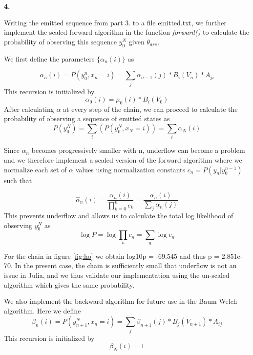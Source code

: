 \documentclass{article}
\begin{document}
\textbf{\large{4.}}

Writing the emitted sequence from part 3. to a file emitted.txt, we further implement the scaled forward algorithm in the function \textit{forward()} to calculate the probability of observing this sequence $y_0^N$ given $\theta_{ass}$.

We first define the parameters $\{\alpha_n(i)\}$ as

\begin{equation}
\alpha_n(i) = P(y_0^n, x_n=i) = \sum_j{\alpha_{n-1}(j) * B_i(V_n) * A_{ji}}
\end{equation}
This recursion is initialized by
\begin{equation}
\alpha_0(i) = \mu_0(i) * B_i(V_0)
\end{equation}
After calculating $\alpha$ at every step of the chain, we can proceed to calculate the probability of observing a sequence of emitted states as
\begin{equation}
P(y_0^N) = \sum_i(P(y_0^N, x_N=i)) = \sum_i{\alpha_N(i)}
\end{equation}

Since $\alpha_n$ becomes progressively smaller with n, underflow can become a problem and we therefore implement a scaled version of the forward algorithm where we normalize each set of $\alpha$ values using normalization constants $c_n = P(y_n | y_0^{n-1})$ such that

\begin{equation}
\hat{\alpha}_n(i) = \dfrac{ \alpha_n(i) }{ \prod_{k=0}^n{c_k}} = \dfrac{ \alpha_n(i) }{ \sum_j{\alpha_n(j)} }
\end{equation}
This prevents underflow and allows us to calculate the total log likelihood of observing $y_0^N$ as
\begin{equation}
\log{P} = \log{\prod_n{c_n}} = \sum_n{\log{c_n}}
\end{equation}

For the chain in figure \ref{fig:ho} we obtain log10p = -69.545 and thus p = 2.851e-70. In the present case, the chain is sufficiently small that underflow is not an issue in Julia, and we thus validate our implementation using the un-scaled algorithm which gives the same probability.

We also implement the backward algorithm for future use in the Baum-Welch algorithm.
Here we define
\begin{equation}
\beta_n(i) = P(y_{n+1}^N, x_n=i) = \sum_j{\beta_{n+1}(j) * B_j(V_{n+1}) * A_{ij}}
\end{equation}
This recursion is initialized by
\begin{equation}
\beta_N(i) =1
\end{equation}
\end{document}
